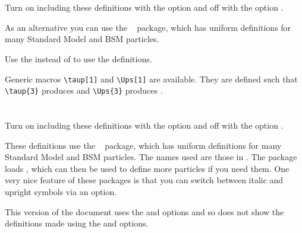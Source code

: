 \documentclass[mhchem, UKenglish, texlive=2016]{\ATLASLATEXPATH atlasdoc}
\begin{document}
\maketitle

\tableofcontents




\twocolumn
\section{}

Turn on including these definitions with the option  and off with the option .

As an alternative you can use the ~\cite{hepparticles} package,
which has uniform definitions for many Standard Model and BSM particles.

Use the  instead of  to use the  definitions.



Generic macros \verb|\taup[1]| and \verb|\Ups[1]| are available.
They are defined such that
\verb|\taup{3}| produces  and
\verb|\Ups{3}| produces .


\newpage
\section{}

Turn on including these definitions with the option  and off with the option .

These definitions use the ~\cite{hepparticles} package,
which has uniform definitions for many Standard Model and BSM particles.
The names used are those in .
The package loads , which can then be used to define more particles if you need them.
One very nice feature of these packages is that you can switch between italic and upright symbols via an option.

This version of the document uses the  and  options and so
does not show the definitions made using the  and  options.
%
\end{document}
